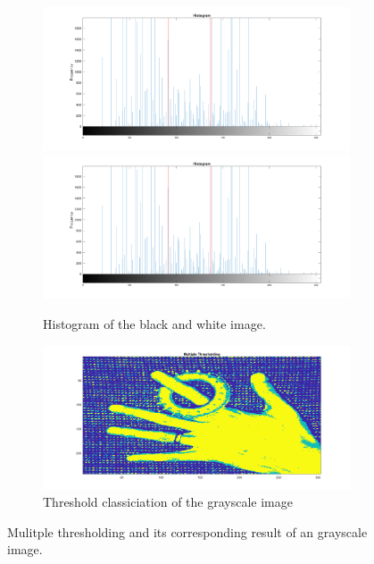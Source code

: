 \documentclass[12pt]{article}
\begin{document}
\begin{figure}[htbp!]
  \begin{subfigure}[b]{0.5\textwidth}
       \centering
       \includegraphics[width=0.9\linewidth]{images/Q2_hist.png}
       \includegraphics[width=0.9\linewidth]{images/Q2_hist.png}
       \caption{Histogram of the black and white image.}
       \label{fig:Q2_hist}
   \end{subfigure}
   \hfill
   \begin{subfigure}[b]{0.5\textwidth}
       \centering
       \includegraphics[width=0.9\linewidth]{images/Q2.png}
       \caption{Threshold classiciation of the grayscale image}
       \label{fig:Q2_im}
   \end{subfigure}
      \caption{Mulitple thresholding and its corresponding result of an grayscale image.}
      \label{fig:Q2}
\end{figure}
\end{document}
